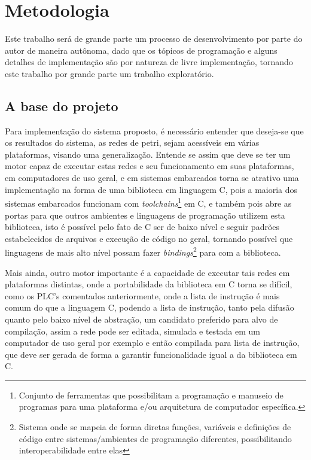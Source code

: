 \chapter{Metodologia}

Este trabalho será de grande parte um processo de desenvolvimento por parte do autor de maneira autônoma, dado que os tópicos de programação e alguns detalhes de implementação são por natureza de livre implementação, tornando este trabalho por grande parte um trabalho exploratório. 

\section{A base do projeto}

Para implementação do sistema proposto, é necessário entender que deseja-se que os resultados do sistema, as redes de petri, sejam acessíveis em várias plataformas, visando uma generalização. Entende se assim que deve se ter um motor capaz de executar estas redes e seu funcionamento em suas plataformas, em computadores de uso geral, e em sistemas embarcados torna se atrativo uma implementação na forma de uma biblioteca em linguagem C, pois a maioria dos sistemas embarcados funcionam com \textit{toolchains}\footnote{Conjunto de ferramentas que possibilitam a programação e manuseio de programas para uma plataforma e/ou arquitetura de computador específica.} em C, e também pois abre as portas para que outros ambientes e linguagens de programação utilizem esta biblioteca, isto é possível pelo fato de C ser de baixo nível e seguir padrões estabelecidos de arquivos e execução de código no geral, tornando possível que linguagens de mais alto nível possam fazer \textit{bindings}\footnote{Sistema onde se mapeia de forma diretas funções, variáveis e definições de código entre sistemas/ambientes de programação diferentes, possibilitando interoperabilidade entre elas} para com a biblioteca. 

Mais ainda, outro motor importante é a capacidade de executar tais redes em plataformas distintas, onde a portabilidade da biblioteca em C torna se difícil, como os PLC's comentados anteriormente, onde a lista de instrução é mais comum do que a linguagem C, podendo a lista de instrução, tanto pela difusão quanto pelo baixo nível de abstração, um candidato preferido para alvo de compilação, assim a rede pode ser editada, simulada e testada em um computador de uso geral por exemplo e então compilada para lista de instrução, que deve ser gerada de forma a garantir funcionalidade igual a da biblioteca em C.

